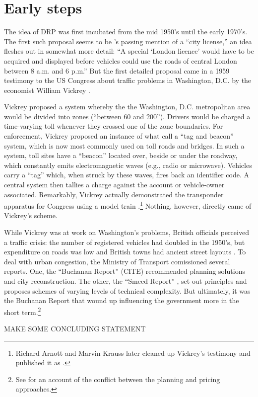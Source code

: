 \section{Early steps}

The idea of DRP was first incubated from the mid 1950's until the early 1970's. The first such proposal seems to be \citet{buchanan1952}'s passing mention of a ``city license,'' an idea \citet{Walters1954} fleshes out in somewhat more detail: ``A special `London licence' would have to be acquired and displayed before vehicles could use the roads of central London between 8 a.m. and 6 p.m.'' But the first detailed proposal came in a 1959 testimony to the US Congress about traffic problems in Washington, D.C. by the economist William Vickrey \citep{Vickrey1959}. 

Vickrey proposed a system whereby the the Washington, D.C. metropolitan area would be divided into zones (``between 60 and 200''). Drivers would be charged a time-varying toll whenever they crossed one of the zone boundaries. For enforcement, Vickrey proposed an instance of what \citet{DePalma2011} call a ``tag and beacon'' system, which is now most commonly used on toll roads and bridges. In such a system, toll sites have a ``beacon'' located over, beside or under the roadway, which constantly emits electromagnetic waves  (e.g., radio or microwave). Vehicles carry a ``tag'' which, when struck by these waves,  fires back an identifier code. A central system then tallies a charge against the account or vehicle-owner associated. Remarkably, Vickrey actually demonstrated the transponder apparatus for Congress using a model train .\footnote{Richard Arnott and Marvin Krauss later cleaned up Vickrey's testimony and published it as \citet{Vickrey1994}.} Nothing, however, directly came of Vickrey's scheme.

While Vickrey was at work on Washington's problems, British officials perceived a traffic crisis: the number of registered vehicles had doubled in the 1950's, but expenditure on roads was low and British towns had ancient street layouts \citep[p.523-524]{Gunn2011}. To deal with urban congestion, the Ministry of Transport comissioned several reports. One, the ``Buchanan Report'' (CITE) recommended planning solutions and city reconstruction. The other, the ``Smeed Report'' \citep{MoT1964}, set out principles and proposes schemes of varying levels of technical complexity. But ultimately, it was the Buchanan Report that wound up influencing the government more in the short term.\footnote{See \citep{Rooney2014} for an account of the conflict between the planning and pricing approaches.}

MAKE SOME CONCLUDING STATEMENT

